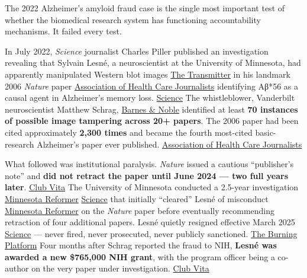The 2022 Alzheimer's amyloid fraud case is the single most important test of whether the biomedical research system has functioning accountability mechanisms. It failed every test.

In July 2022, \emph{Science} journalist Charles Piller published an investigation revealing that Sylvain Lesné, a neuroscientist at the University of Minnesota, had apparently manipulated Western blot images \href{https://www.thetransmitter.org/science-and-society/doctored-fraud-arrogance-and-tragedy-in-the-quest-to-cure-alzheimers-an-excerpt/}{The Transmitter} in his landmark 2006 \emph{Nature} paper \href{https://healthjournalism.org/blog/2022/09/how-i-did-it-reporting-on-apparent-misconduct-in-influential-alzheimers-research/}{Association of Health Care Journalists} identifying Aβ*56 as a causal agent in Alzheimer's memory loss. \href{https://www.science.org/content/article/potential-fabrication-research-images-threatens-key-theory-alzheimers-disease}{Science} The whistleblower, Vanderbilt neuroscientist Matthew Schrag, \href{https://www.barnesandnoble.com/w/doctored-charles-piller/1145681914}{Barnes \& Noble} identified at least \textbf{70 instances of possible image tampering across 20+ papers}. The 2006 paper had been cited approximately \textbf{2,300 times} and became the fourth most-cited basic-research Alzheimer's paper ever published. \href{https://healthjournalism.org/blog/2022/09/how-i-did-it-reporting-on-apparent-misconduct-in-influential-alzheimers-research/}{Association of Health Care Journalists}

What followed was institutional paralysis. \emph{Nature} issued a cautious ``publisher's note'' and \textbf{did not retract the paper until June 2024 --- two full years later}. \href{https://www.clubvita.net/us/news-and-insights/alzheimers-research-scandal}{Club Vita} The University of Minnesota conducted a 2.5-year investigation \href{https://minnesotareformer.com/briefs/alzheimers-researcher-alleged-to-have-doctored-images-is-leaving-umn/}{Minnesota Reformer} \href{https://www.science.org/content/article/alzheimer-s-scientist-resigns-after-university-finds-data-integrity-concerns-papers}{Science} that initially ``cleared'' Lesné of misconduct \href{https://minnesotareformer.com/briefs/alzheimers-researcher-alleged-to-have-doctored-images-is-leaving-umn/}{Minnesota Reformer} on the \emph{Nature} paper before eventually recommending retraction of four additional papers. Lesné quietly resigned effective March 2025 \href{https://www.science.org/content/article/alzheimer-s-scientist-resigns-after-university-finds-data-integrity-concerns-papers}{Science} --- never fired, never prosecuted, never publicly sanctioned. \href{https://www.theburningplatform.com/2026/03/26/the-great-alzheimers-scam-and-the-proven-cures-theyve-buried-for-billions-2/}{The Burning Platform} Four months after Schrag reported the fraud to NIH, \textbf{Lesné was awarded a new \$765,000 NIH grant}, with the program officer being a co-author on the very paper under investigation. \href{https://www.clubvita.net/us/news-and-insights/alzheimers-research-scandal}{Club Vita}

